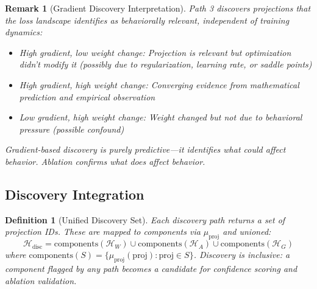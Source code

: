 \documentclass[11pt]{article}
\newtheorem{definition}{Definition}[section]
\newtheorem{remark}{Remark}[section]
\begin{document}
\begin{remark}[Gradient Discovery Interpretation]
\label{rem:gradient-discovery-interpretation}
Path 3 discovers projections that the loss landscape identifies as behaviorally relevant, independent of training dynamics:
\begin{itemize}[nosep]
\item High gradient, low weight change: Projection is relevant but optimization didn't modify it (possibly due to regularization, learning rate, or saddle points)
\item High gradient, high weight change: Converging evidence from mathematical prediction and empirical observation
\item Low gradient, high weight change: Weight changed but not due to behavioral pressure (possible confound)
\end{itemize}
Gradient-based discovery is purely predictive---it identifies what \emph{could} affect behavior. Ablation confirms what \emph{does} affect behavior.
\end{remark}

\subsection{Discovery Integration}
\label{sec:discovery-integration}

\begin{definition}[Unified Discovery Set]
\label{def:unified-discovery-set}
Each discovery path returns a set of projection IDs. These are mapped to components via $\mu_{\text{proj}}$ and unioned:
\begin{equation}
\mathcal{H}_{\text{disc}} = \text{components}(\mathcal{H}_W) \cup \text{components}(\mathcal{H}_A) \cup \text{components}(\mathcal{H}_G)
\end{equation}
where $\text{components}(S) = \{\mu_{\text{proj}}(\text{proj}) : \text{proj} \in S\}$. Discovery is inclusive: a component flagged by \emph{any} path becomes a candidate for confidence scoring and ablation validation.
\end{definition}
\end{document}
